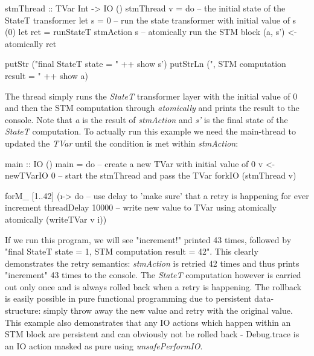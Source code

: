 \begin{HaskellCode}
stmThread :: TVar Int -> IO ()
stmThread v = do
  -- the initial state of the StateT transformer
  let s = 0
  -- run the state transformer with initial value of s (0)
  let ret = runStateT stmAction s
  -- atomically run the STM block
  (a, s') <- atomically ret
  
  putStr ("final StateT state     = " ++ show s')
  putStrLn (", STM computation result = " ++ show a)
\end{HaskellCode}

The thread simply runs the \textit{StateT} transformer layer with the initial value of 0 and then the STM computation through \textit{atomically} and prints the result to the console. Note that \textit{a} is the result of \textit{stmAction} and \textit{s'} is the final state of the \textit{StateT} computation. To actually run this example we need the main-thread to updated the \textit{TVar} until the condition is met within \textit{stmAction}:

\begin{HaskellCode}
main :: IO ()
main = do
  -- create a new TVar with initial value of 0
  v <- newTVarIO 0 
  -- start the stmThread and pass the TVar
  forkIO (stmThread v)

  forM_ [1..42] (\i -> do
    -- use delay to 'make sure' that a retry is happening for ever increment
    threadDelay 10000
    -- write new value to TVar using atomically
    atomically (writeTVar v i))
\end{HaskellCode}

If we run this program, we will see "increment!" printed 43 times, followed by "final StateT state = 1, STM computation result = 42". This clearly demonstrates the retry semantics: \textit{stmAction} is retried 42 times and thus prints "increment" 43 times to the console. The \textit{StateT} computation however is carried out only once and is always rolled back when a retry is happening. The rollback is easily possible in pure functional programming due to persistent data-structure: simply throw away the new value and retry with the original value. This example also demonstrates that any IO actions which happen within an STM block are persistent and can obviously not be rolled back - Debug.trace is an IO action masked as pure using \textit{unsafePerformIO}.